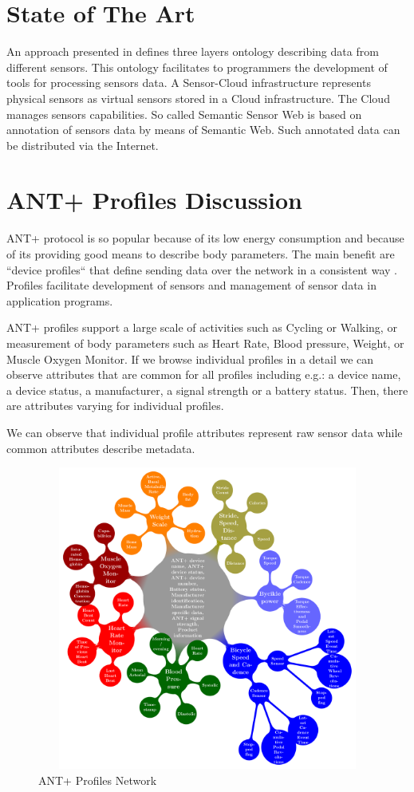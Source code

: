 \documentclass[conference]{IEEEtran}
\begin{document}
\section{State of The Art}\label{sec:state-of-the-art}

An approach presented in \cite{mehmood2014ontology} defines three layers ontology describing data from different sensors. This ontology facilitates to programmers the development of tools for processing sensors data. A Sensor-Cloud infrastructure \cite{5635688} represents physical sensors as virtual sensors stored in a Cloud infrastructure. The Cloud manages sensors capabilities. So called Semantic Sensor Web \cite{4557983} is based on annotation of sensors data by means of Semantic Web. Such annotated data can be distributed via the Internet.


\section{ANT+ Profiles Discussion}\label{sec:ant-plus-profiles}
ANT+ protocol is so popular because of its low energy consumption and because of its providing good means to describe body parameters. The main benefit are ``device profiles`` that define sending data over the network in a consistent way \cite{innovations2013ant}. Profiles facilitate development of sensors and management of sensor data in application programs.

ANT+ profiles support a large scale of activities such as Cycling or Walking, or measurement of body parameters such as Heart Rate, Blood pressure, Weight, or Muscle Oxygen Monitor. If we browse individual profiles in a detail we can observe attributes that are common for all profiles including e.g.: a device name, a device status, a manufacturer, a signal strength or a battery status. Then, there are attributes varying for individual profiles. 

We can observe that individual profile attributes represent raw sensor data while common attributes describe metadata. 


\begin{figure}
\centering\includegraphics[width=12cm, height=10cm]{AntPlusProfiles}
\caption{\label{AntPlus}ANT+ Profiles Network}
\end{figure}
\end{document}

